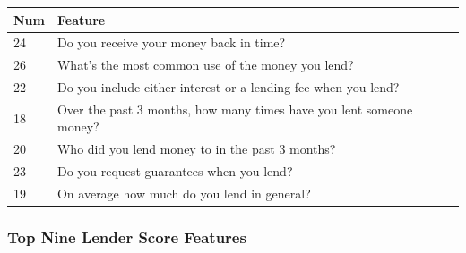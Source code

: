 \begin{longtable}[]{@{}ll@{}}
\toprule
Num & Feature\tabularnewline
\midrule
\endhead
24 & Do you receive your money back in time?\tabularnewline
26 & What's the most common use of the money you lend?\tabularnewline
22 & Do you include either interest or a lending fee when you
lend?\tabularnewline
18 & Over the past 3 months, how many times have you lent someone
money?\tabularnewline
20 & Who did you lend money to in the past 3 months?\tabularnewline
23 & Do you request guarantees when you lend?\tabularnewline
19 & On average how much do you lend in general?\tabularnewline
\bottomrule
\end{longtable}

\hypertarget{top-nine-lender-score-features}{%
\subsubsection{Top Nine Lender Score
Features}\label{top-nine-lender-score-features}}


